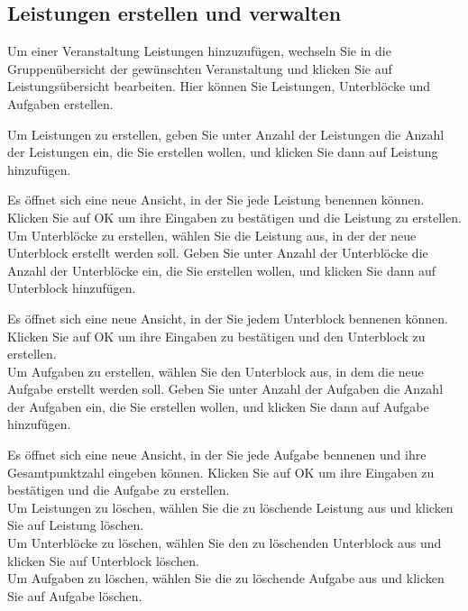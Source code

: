 \documentclass{Handbuch}
\begin{document}
\subsection{Leistungen erstellen und verwalten}
Um einer Veranstaltung Leistungen hinzuzufügen, wechseln Sie in die Gruppenübersicht der gewünschten Veranstaltung und klicken Sie auf \frqq Leistungsübersicht bearbeiten\flqq. Hier können Sie Leistungen, Unterblöcke und Aufgaben erstellen.
\begin{center}
\end{center}
Um Leistungen zu erstellen, geben Sie unter \glqq Anzahl der Leistungen\grqq{} die Anzahl der Leistungen ein, die Sie erstellen wollen, und klicken Sie dann auf \frqq Leistung hinzufügen\flqq. 
\begin{center}
\end{center}
Es öffnet sich eine neue Ansicht, in der Sie jede Leistung benennen können. Klicken Sie auf \frqq OK\flqq{} um ihre Eingaben zu bestätigen und die Leistung zu erstellen. \\
Um Unterblöcke zu erstellen, wählen Sie die Leistung aus, in der der neue Unterblock erstellt werden soll. Geben Sie unter \glqq Anzahl der Unterblöcke\grqq{} die Anzahl der Unterblöcke ein, die Sie erstellen wollen, und klicken Sie dann auf \frqq Unterblock hinzufügen\flqq. 
\begin{center}
\end{center}
Es öffnet sich eine neue Ansicht, in der Sie jedem Unterblock bennenen können. Klicken Sie auf \frqq OK\flqq{} um ihre Eingaben zu bestätigen und den Unterblock zu erstellen. \\
Um Aufgaben zu erstellen, wählen Sie den Unterblock aus, in dem die neue Aufgabe erstellt werden soll. Geben Sie unter \glqq Anzahl der Aufgaben\grqq{} die Anzahl der Aufgaben ein, die Sie erstellen wollen, und klicken Sie dann auf \frqq Aufgabe hinzufügen\flqq. 
\begin{center}
\end{center}
Es öffnet sich eine neue Ansicht, in der Sie jede Aufgabe bennenen und ihre Gesamtpunktzahl eingeben können. Klicken Sie auf \frqq OK\flqq{} um ihre Eingaben zu bestätigen und die Aufgabe zu erstellen.\\
Um Leistungen zu löschen, wählen Sie die zu löschende Leistung aus und klicken Sie auf \frqq Leistung löschen\flqq.\\
Um Unterblöcke zu löschen, wählen Sie den zu löschenden Unterblock aus und klicken Sie auf \frqq Unterblock löschen\flqq.\\
Um Aufgaben zu löschen, wählen Sie die zu löschende Aufgabe aus und klicken Sie auf \frqq Aufgabe löschen\flqq.\\
\end{document}
